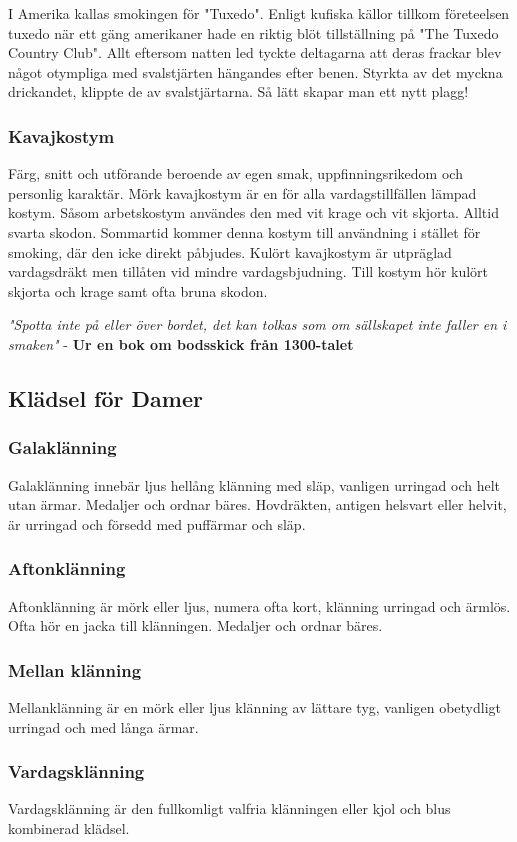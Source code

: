     I Amerika kallas smokingen för "Tuxedo". Enligt kufiska källor tillkom företeelsen tuxedo när ett gäng amerikaner hade en riktig blöt tillställning på "The Tuxedo Country Club". Allt eftersom natten led tyckte deltagarna att deras frackar blev något otympliga med svalstjärten hängandes efter benen. Styrkta av det myckna drickandet, klippte de av svalstjärtarna. Så lätt skapar man ett nytt plagg!

    \subsubsection{\textbf{Kavajkostym}}

    Färg, snitt och utförande beroende av egen smak, uppfinningsrikedom och personlig karaktär. Mörk kavajkostym är en för alla vardagstillfällen lämpad kostym. Såsom arbetskostym användes den med vit krage och vit skjorta. Alltid svarta skodon. Sommartid kommer denna kostym till användning i stället för smoking, där den icke direkt påbjudes. Kulört kavajkostym är utpräglad vardagsdräkt men tillåten vid mindre vardagsbjudning. Till kostym hör kulört skjorta och krage samt ofta bruna skodon.

    \textit{"Spotta inte på eller över bordet, det kan tolkas som om sällskapet inte faller en i smaken"} - \textbf{Ur en bok om bodsskick från 1300-talet}

    \subsection{\textbf{Klädsel för Damer}}
    \subsubsection{\textbf{Galaklänning}}
    Galaklänning innebär ljus hellång klänning med släp, vanligen urringad och helt utan ärmar. Medaljer och ordnar bäres. Hovdräkten, antigen helsvart eller helvit, är urringad och försedd med puffärmar och släp.

    \subsubsection{\textbf{Aftonklänning}}
    Aftonklänning är mörk eller ljus, numera ofta kort, klänning urringad och ärmlös. Ofta hör en jacka till klänningen. Medaljer och ordnar bäres.

    \subsubsection{\textbf{Mellan klänning}}
    Mellanklänning är en mörk eller ljus klänning av lättare tyg, vanligen obetydligt urringad och med långa ärmar.

    \subsubsection{\textbf{Vardagsklänning}}
    Vardagsklänning är den fullkomligt valfria klänningen eller kjol och blus kombinerad klädsel.
    

    
    

    \newpage